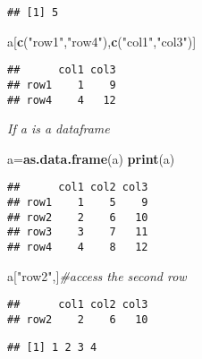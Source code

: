 \documentclass[]{book}
\newenvironment{Shaded}{\begin{snugshade}}{\end{snugshade}}
\newcommand{\KeywordTok}[1]{\textcolor[rgb]{0.13,0.29,0.53}{\textbf{#1}}}
\newcommand{\StringTok}[1]{\textcolor[rgb]{0.31,0.60,0.02}{#1}}
\newcommand{\CommentTok}[1]{\textcolor[rgb]{0.56,0.35,0.01}{\textit{#1}}}
\newcommand{\OperatorTok}[1]{\textcolor[rgb]{0.81,0.36,0.00}{\textbf{#1}}}
\newcommand{\NormalTok}[1]{#1}
\theoremstyle{definition}
\theoremstyle{definition}
\theoremstyle{definition}
\theoremstyle{remark}
\begin{document}
\begin{verbatim}
## [1] 5
\end{verbatim}

\begin{Shaded}
\begin{Highlighting}[]
\NormalTok{a[}\KeywordTok{c}\NormalTok{(}\StringTok{"row1"}\NormalTok{,}\StringTok{"row4"}\NormalTok{),}\KeywordTok{c}\NormalTok{(}\StringTok{"col1"}\NormalTok{,}\StringTok{"col3"}\NormalTok{)]}
\end{Highlighting}
\end{Shaded}

\begin{verbatim}
##      col1 col3
## row1    1    9
## row4    4   12
\end{verbatim}

\emph{If a is a dataframe}

\begin{Shaded}
\begin{Highlighting}[]
\NormalTok{a=}\KeywordTok{as.data.frame}\NormalTok{(a)}
\KeywordTok{print}\NormalTok{(a)}
\end{Highlighting}
\end{Shaded}

\begin{verbatim}
##      col1 col2 col3
## row1    1    5    9
## row2    2    6   10
## row3    3    7   11
## row4    4    8   12
\end{verbatim}

\begin{Shaded}
\begin{Highlighting}[]
\NormalTok{a[}\StringTok{"row2"}\NormalTok{,]}\CommentTok{#access the second row}
\end{Highlighting}
\end{Shaded}

\begin{verbatim}
##      col1 col2 col3
## row2    2    6   10
\end{verbatim}

\begin{Shaded}
\end{Shaded}

\begin{verbatim}
## [1] 1 2 3 4
\end{verbatim}
\end{document}
